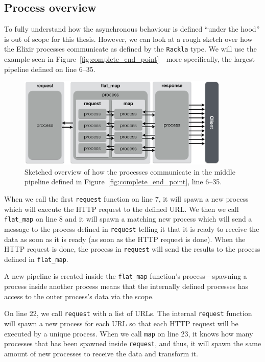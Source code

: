 \documentclass{cslthse-msc}
\begin{document}
\subsection{Process overview}
To fully understand how the asynchronous behaviour is defined \enquote{under the hood} is out of scope for this thesis. However, we can look at a rough sketch over how the Elixir processes communicate as defined by the \lstinline{Rackla} type. We will use the example seen in Figure~\ref{fig:complete_end_point}---more specifically, the largest pipeline defined on line 6--35.

\begin{figure}[H]
  \centering
    \begin{center}
      \includegraphics[width=0.9\textwidth]{images/process_overview.png}
    \end{center}
  \caption{Sketched overview of how the processes communicate in the middle pipeline defined in Figure~\ref{fig:complete_end_point}, line 6--35.}
  \label{fig:process}
\end{figure}

When we call the first \lstinline{request} function on line 7, it will spawn a new process which will execute the HTTP request to the defined URL. We then we call \lstinline{flat_map} on line 8 and it will spawn a matching new process which will send a message to the process defined in \lstinline{request} telling it that it is ready to receive the data as soon as it is ready (as soon as the HTTP request is done). When the HTTP request is done, the process in \lstinline{request} will send the results to the process defined in \lstinline{flat_map}.

A new pipeline is created inside the \lstinline{flat_map} function's process---spawning a process inside another process means that the internally defined processes has access to the outer process's data via the scope. 

On line 22, we call \lstinline{request} with a list of URLs. The internal \lstinline{request} function will spawn a new process for each URL so that each HTTP request will be executed by a unique process. When we call \lstinline{map} on line 23, it knows how many processes that has been spawned inside \lstinline{request}, and thus, it will spawn the same amount of new processes to receive the data and transform it.
\end{document}
